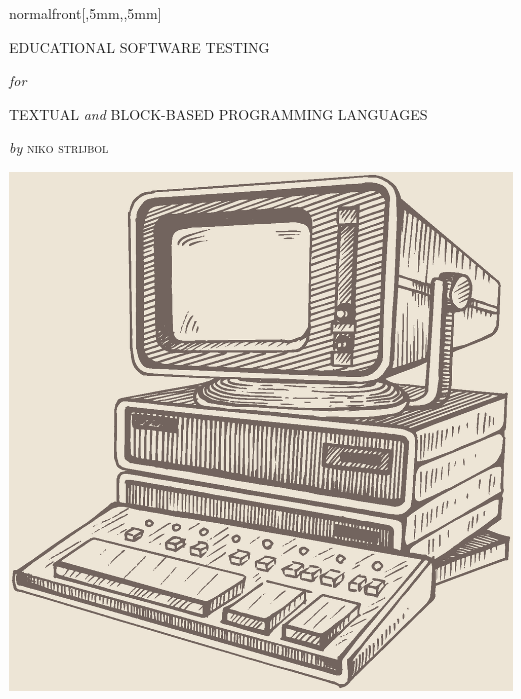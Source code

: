 \documentclass[coverheight=240mm,coverwidth=170mm,spinewidth=15mm]{bookcover}
\begin{document}
\begin{bookcover}
    \begin{bookcoverelement}{normal}{front}[,5mm,,5mm]
        \vspace*{0.5cm}%
        \begin{center}
            \fontsize{32pt}{40pt}\selectfont EDUCATIONAL SOFTWARE TESTING
        \end{center}%
        \begin{center}
            \fontsize{18pt}{23pt}\selectfont\textit{for}
        \end{center}%
        \begin{center}
            \fontsize{25pt}{30pt}\selectfont TEXTUAL \textit{\fontsize{20pt}{23pt}\selectfont and} BLOCK-BASED PROGRAMMING LANGUAGES
        \end{center}%
        \vspace*{0.5cm}%
        \begin{center}
            \fontsize{20pt}{23pt}\selectfont\textit{\fontsize{15pt}{23pt}\selectfont by} \textsc{niko strijbol}
        \end{center}%
        \vspace*{1cm}
        \begin{center}
            \includegraphics[width=0.55\partwidth]{iStock-886097516}%

\end{center}
\end{bookcoverelement}
\end{bookcover}
\end{document}
